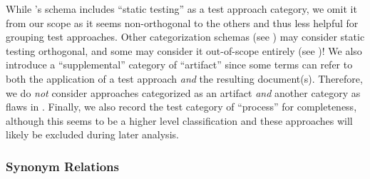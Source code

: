 
While \citet{IEEE2022}'s schema includes ``static testing'' as a test approach
category, we omit it from our scope as it seems non-orthogonal to the others
and thus less helpful for grouping test approaches. \ifnotpaper Other
    categorization schemas (see ) may consider static testing
    orthogonal, and some may consider it out-of-scope entirely (see
    )! \fi We also introduce a ``supplemental'' category of
``artifact'' since some terms can refer to both the
application of a test approach \emph{and} the resulting document(s).
Therefore, we do \emph{not} consider approaches categorized as an artifact
\emph{and} another category as flaws in .
Finally, we also record the test category of ``process'' for completeness,
although this seems to be a higher level classification and these approaches
will likely be excluded during later analysis.

\ifnotpaper
    \begin{landscape}
        \begin{table*}[p]
            \ieeeCatsTable{}
        \end{table*}
    \end{landscape}
\fi


\subsubsection{Synonym Relations}\label{syn-rels}

